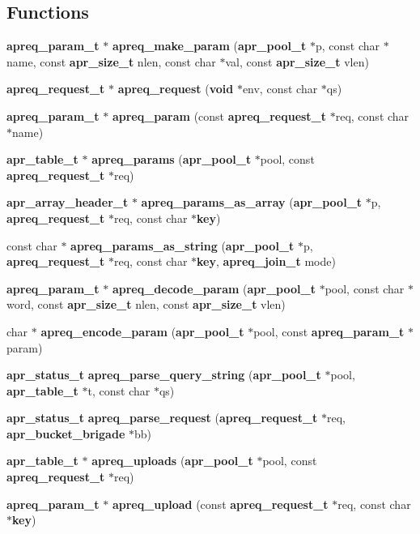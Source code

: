 \subsection*{Functions}
\begin{CompactItemize}
\item 
{\bf apreq\_\-param\_\-t} $\ast$ {\bf apreq\_\-make\_\-param} ({\bf apr\_\-pool\_\-t} $\ast$p, const char $\ast$name, const {\bf apr\_\-size\_\-t} nlen, const char $\ast$val, const {\bf apr\_\-size\_\-t} vlen)
\item 
{\bf apreq\_\-request\_\-t} $\ast$ {\bf apreq\_\-request} ({\bf void} $\ast$env, const char $\ast$qs)
\item 
{\bf apreq\_\-param\_\-t} $\ast$ {\bf apreq\_\-param} (const {\bf apreq\_\-request\_\-t} $\ast$req, const char $\ast$name)
\item 
{\bf apr\_\-table\_\-t} $\ast$ {\bf apreq\_\-params} ({\bf apr\_\-pool\_\-t} $\ast$pool, const {\bf apreq\_\-request\_\-t} $\ast$req)
\item 
{\bf apr\_\-array\_\-header\_\-t} $\ast$ {\bf apreq\_\-params\_\-as\_\-array} ({\bf apr\_\-pool\_\-t} $\ast$p, {\bf apreq\_\-request\_\-t} $\ast$req, const char $\ast${\bf key})
\item 
const char $\ast$ {\bf apreq\_\-params\_\-as\_\-string} ({\bf apr\_\-pool\_\-t} $\ast$p, {\bf apreq\_\-request\_\-t} $\ast$req, const char $\ast${\bf key}, {\bf apreq\_\-join\_\-t} mode)
\item 
{\bf apreq\_\-param\_\-t} $\ast$ {\bf apreq\_\-decode\_\-param} ({\bf apr\_\-pool\_\-t} $\ast$pool, const char $\ast$word, const {\bf apr\_\-size\_\-t} nlen, const {\bf apr\_\-size\_\-t} vlen)
\item 
char $\ast$ {\bf apreq\_\-encode\_\-param} ({\bf apr\_\-pool\_\-t} $\ast$pool, const {\bf apreq\_\-param\_\-t} $\ast$param)
\item 
{\bf apr\_\-status\_\-t} {\bf apreq\_\-parse\_\-query\_\-string} ({\bf apr\_\-pool\_\-t} $\ast$pool, {\bf apr\_\-table\_\-t} $\ast$t, const char $\ast$qs)
\item 
{\bf apr\_\-status\_\-t} {\bf apreq\_\-parse\_\-request} ({\bf apreq\_\-request\_\-t} $\ast$req, {\bf apr\_\-bucket\_\-brigade} $\ast$bb)
\item 
{\bf apr\_\-table\_\-t} $\ast$ {\bf apreq\_\-uploads} ({\bf apr\_\-pool\_\-t} $\ast$pool, const {\bf apreq\_\-request\_\-t} $\ast$req)
\item 
{\bf apreq\_\-param\_\-t} $\ast$ {\bf apreq\_\-upload} (const {\bf apreq\_\-request\_\-t} $\ast$req, const char $\ast${\bf key})

\end{CompactItemize}
